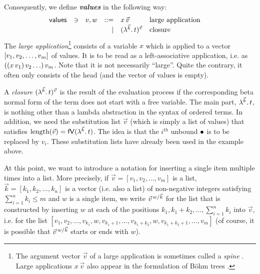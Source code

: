 \documentclass[submission,copyright,creativecommons]{eptcs}
\newcommand{\define}[1]{\mbox{\textbf{\textit{#1}}}}
\begin{document}
Consequently, we define \define{values} in the following way:
\[ 
\begin{array}{lllrll@{\qquad}}
\mathsf{values}       & \ni & v,w & ::= & x \sspace \vec v & \mbox{large application} \\ 
			                   &&& \mid & \Val {\vec k} t {\vec v} & \mbox{closure} \\ 
\end{array}
\]
The \emph{large application}\footnote{
The argument vector $\vec v$ of a large application is sometimes
called a \emph{spine} \cite{cervesatoPfenning:spineCalculus}.  Large
applications $x\,\vec v$ also appear in the formulation of B\"ohm
trees \cite{barendregt:lambdacalculus}.}
 consists of a variable $x$ which is applied to a vector $\ve{v_1, v_2, \ldots, v_m}$ of values. It is to be read as a left-associative application, i.e. as $\pa{\pa{x \, v_1} v_2 \ldots } v_m$. 
Note that it is not necessarily ``large''. Quite the contrary, it
often only consists of the head (and the vector of values is empty).

A \emph{closure} $\Val {\vec k} t {\vec v}$ is the result of the evaluation process if the corresponding beta normal form of the term does not start with a free variable. The main part, $\LaO {\vec k} t$, is nothing other than a lambda abstraction in the syntax of ordered terms.
In addition, we need the substitution list $\vec v$ (which is simply a list of values) that satisfies $\length {\vec v} = \freevars{\LaO {\vec k} t}$. %
The idea is that the $i^{th}$ unbound $\ovar$ is to be replaced by $v_i$.  These substitution lists have already been used in the example above.


At this point, we want to introduce a notation for inserting a single item multiple times into a list. More precisely, if $\vec v = [v_1, v_2, \ldots, v_m]$ is a list, 
$\vec k = [k_1, k_2, \ldots, k_n]$ is a vector (i.e. also a list) of  non-negative integers satisfying $\sum_{i=1}^n k_i \leq m$ and $w$ is a single item, we write $\multiinsert {\vec v} {\vec k} {w}$  for the list that is constructed by inserting $w$ at each of the positions $k_1, k_1 + k_2, \ldots, \sum_{i=1}^n k_i$ into $\vec v$, i.e. for the list $[v_1, v_2, \ldots, v_{k_1}, w, v_{k_1 + 1}, \ldots, v_{k_1 + k_2}, w, v_{k_1 + k_2 + 1}, \ldots, v_m]$ (of course, it is possible that $\multiinsert {\vec v} {\vec k} {w}$ starts or ends with $w$).
\end{document}
